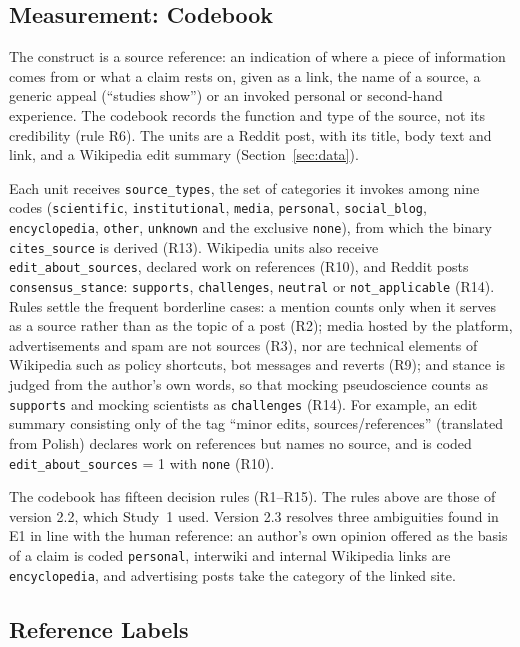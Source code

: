\documentclass[10pt,a4paper]{article}
\newcommand{\kod}[1]{\texttt{#1}}
\begin{document}
\subsection{Measurement: Codebook}
\label{sec:measurement}

The construct is a source reference: an indication of where a piece of information comes
from or what a claim rests on, given as a link, the name of a source, a generic appeal
(``studies show'') or an invoked personal or second-hand experience. The codebook records
the function and type of the source, not its credibility (rule R6). The units are a Reddit
post, with its title, body text and link, and a Wikipedia edit summary (Section~\ref{sec:data}).

Each unit receives \kod{source\_types}, the set of categories it invokes among nine codes
(\kod{scientific}, \kod{institutional}, \kod{media}, \kod{personal}, \kod{social\_blog},
\kod{encyclopedia}, \kod{other}, \kod{unknown} and the exclusive \kod{none}), from which
the binary \kod{cites\_source} is derived (R13). Wikipedia units also receive
\kod{edit\_about\_sources}, declared work on references (R10), and Reddit posts
\kod{consensus\_stance}: \kod{supports}, \kod{challenges}, \kod{neutral} or
\kod{not\_applicable} (R14). Rules settle the frequent borderline cases: a mention counts
only when it serves as a source rather than as the topic of a post (R2); media hosted by
the platform, advertisements and spam are not sources (R3), nor are technical elements of
Wikipedia such as policy shortcuts, bot messages and reverts (R9); and stance is judged
from the author's own words, so that mocking pseudoscience counts as \kod{supports} and
mocking scientists as \kod{challenges} (R14).
For example, an edit summary consisting only of the tag ``minor edits, sources/references''
(translated from Polish) declares work on references but names no source, and is coded
\kod{edit\_about\_sources} = 1 with \kod{none} (R10).

The codebook has fifteen decision rules (R1--R15). The rules above are those of version 2.2,
which Study~1 used. Version 2.3 resolves three ambiguities found in E1 in line with the
human reference: an author's own opinion offered as the basis of a claim is coded
\kod{personal}, interwiki and internal Wikipedia links are \kod{encyclopedia}, and
advertising posts take the category of the linked site.

\subsection{Reference Labels}
\label{sec:references}
\end{document}
